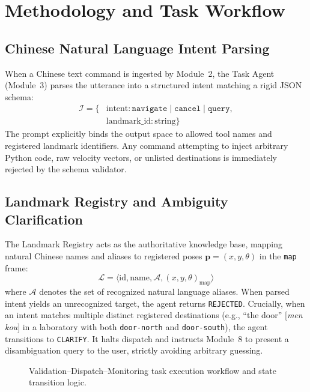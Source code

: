 \documentclass[conference]{IEEEtran}
\begin{document}
\section{Methodology and Task Workflow}

\subsection{Chinese Natural Language Intent Parsing}
When a Chinese text command is ingested by Module~2, the Task Agent (Module~3) parses the utterance into a structured intent matching a rigid JSON schema:
\begin{equation}
\label{eq:intent}
\begin{aligned}
\mathcal{I} = \{ & \text{intent}: \texttt{navigate} \mid \texttt{cancel} \mid \texttt{query}, \\
& \text{landmark\_id}: \text{string} \}
\end{aligned}
\end{equation}
The prompt explicitly binds the output space to allowed tool names and registered landmark identifiers. Any command attempting to inject arbitrary Python code, raw velocity vectors, or unlisted destinations is immediately rejected by the schema validator.

\subsection{Landmark Registry and Ambiguity Clarification}
The Landmark Registry acts as the authoritative knowledge base, mapping natural Chinese names and aliases to registered poses $\mathbf{p} = (x, y, \theta)$ in the \texttt{map} frame:
\begin{equation}
\label{eq:landmark}
\mathcal{L} = \langle \text{id}, \text{name}, \mathcal{A}, (x, y, \theta)_{\text{map}} \rangle
\end{equation}
where $\mathcal{A}$ denotes the set of recognized natural language aliases. When parsed intent yields an unrecognized target, the agent returns \texttt{REJECTED}. Crucially, when an intent matches multiple distinct registered destinations (e.g., ``the door'' [\textit{men kou}] in a laboratory with both \texttt{door-north} and \texttt{door-south}), the agent transitions to \texttt{CLARIFY}. It halts dispatch and instructs Module~8 to present a disambiguation query to the user, strictly avoiding arbitrary guessing.

\begin{figure}[t]
\centering

\caption{Validation--Dispatch--Monitoring task execution workflow and state transition logic.}
\label{fig:workflow}
\end{figure}
\end{document}
